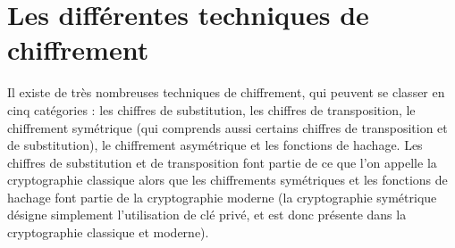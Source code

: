 \chapter{Les différentes techniques de chiffrement}
Il existe de très nombreuses techniques de chiffrement, qui
peuvent se classer en cinq catégories : les chiffres de
substitution, les chiffres de transposition, le chiffrement
symétrique (qui comprends aussi certains chiffres de transposition
et de substitution), le chiffrement asymétrique et les fonctions de
hachage.
Les chiffres de substitution et de transposition font partie de ce
que l'on appelle la cryptographie classique alors que les
chiffrements symétriques et les fonctions de hachage
font partie de la cryptographie moderne (la cryptographie
symétrique désigne simplement l'utilisation de clé privé, et
est donc présente dans la cryptographie classique et moderne).










